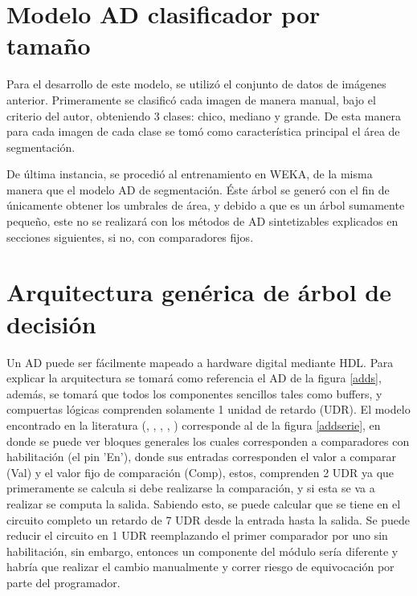 \documentclass[twoside,spanish,ESP,MSc]{plantillaLabUPV}
\theoremstyle{definition}
\begin{document}
\section{Modelo AD clasificador por tamaño}

Para el desarrollo de este modelo, se utilizó el conjunto de datos de imágenes anterior. Primeramente se clasificó cada imagen de manera manual, bajo el criterio del autor, obteniendo 3 clases: chico, mediano y grande. De esta manera para cada imagen de cada clase se tomó como característica principal el área de segmentación.

De última instancia, se procedió al entrenamiento en WEKA, de la misma manera que el modelo AD de segmentación. Éste árbol se generó con el fin de únicamente obtener los umbrales de área, y debido a que es un árbol sumamente pequeño, este no se realizará con los métodos de AD sintetizables explicados en secciones siguientes, si no, con comparadores fijos.


\section{Arquitectura genérica de árbol de decisión}

Un AD puede ser fácilmente mapeado a hardware digital mediante HDL. Para explicar la arquitectura se tomará como referencia el AD de la figura \ref{adds}, además, se tomará que todos los componentes sencillos tales como buffers, y compuertas lógicas comprenden solamente 1 unidad de retardo (UDR). El modelo encontrado en la literatura (\cite{ad1}, \cite{6034358}, \cite{4211794}, \cite{ad2}, \cite{ad3}) corresponde al de la figura \ref{addserie}, en donde se puede ver bloques generales los cuales corresponden a comparadores con habilitación (el pin 'En'), donde sus entradas corresponden el valor a comparar (Val) y el valor fijo de comparación (Comp), estos, comprenden 2 UDR ya que primeramente se calcula si debe realizarse la comparación, y si esta se va a realizar se computa la salida. Sabiendo esto, se puede calcular que se tiene en el circuito completo un retardo de 7 UDR desde la entrada hasta la salida. Se puede reducir el circuito en 1 UDR reemplazando el primer comparador por uno sin habilitación, sin embargo, entonces un componente del módulo sería diferente y habría que realizar el cambio manualmente y correr riesgo de equivocación por parte del programador.
\end{document}
